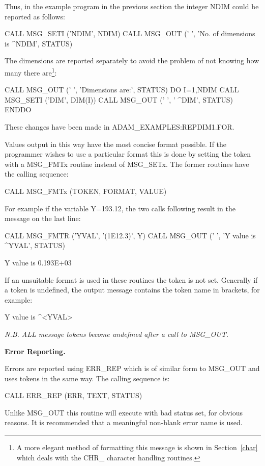 \documentclass[twoside,11pt,nolof]{starlink}
\begin{document}
Thus, in the example program in the previous section the integer NDIM could
be reported as follows:
\begin{terminalv}
      CALL MSG_SETI ('NDIM', NDIM)
      CALL MSG_OUT (' ', 'No. of dimensions is ^NDIM', STATUS)
\end{terminalv}
The dimensions are reported separately to avoid the problem
of not knowing how many there are\footnote{A more elegant method of
formatting this message is shown in Section~\ref{char} which deals with
the CHR\_ character handling routines.}:
\begin{terminalv}
      CALL MSG_OUT (' ', 'Dimensions are:', STATUS)
      DO I=1,NDIM
         CALL MSG_SETI ('DIM', DIM(I))
         CALL MSG_OUT ('  ', '             ^DIM', STATUS)
      ENDDO
\end{terminalv}
These changes have been made in ADAM\_EXAMPLES:REPDIM1.FOR.

Values output in this way have the most concise format possible.
If the programmer wishes to use a particular format this is done
by setting the token with a MSG\_FMTx routine instead
of MSG\_SETx.
The former routines have the calling sequence:
\begin{terminalv}
      CALL MSG_FMTx (TOKEN, FORMAT, VALUE)
\end{terminalv}
For example if the variable Y=193.12, the two calls following result in the
message on the last line:
\begin{terminalv}
      CALL MSG_FMTR ('YVAL', '(1E12.3)', Y)
      CALL MSG_OUT (' ', 'Y value is ^YVAL', STATUS)

  Y value is  0.193E+03
\end{terminalv}
If an unsuitable format is used in these  routines the token is not set.
Generally if a token is undefined, the output message contains the token name
in brackets, for example:
\begin{terminalv}
Y value is ^<YVAL>
\end{terminalv}
{\sl N.B. ALL message tokens become undefined after a call to MSG\_OUT.}

{\bigskip\large\bf Error Reporting.}

Errors are reported using ERR\_REP which is of similar form to
MSG\_OUT and uses tokens in the same way. The calling sequence is:
\begin{terminalv}
      CALL ERR_REP (ERR, TEXT, STATUS)
\end{terminalv}
Unlike MSG\_OUT this routine will execute with bad status set, for obvious
reasons.
It is recommended that a meaningful non-blank error name is used.
\end{document}
